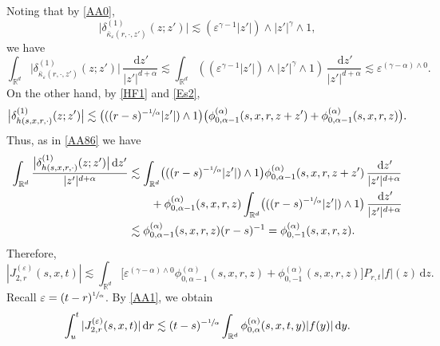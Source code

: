 \documentclass[JEP,XML,SOM,Unicode,published]{cedram}
\theoremstyle{plain}
\theoremstyle{definition}
\let\eps\varepsilon
\newcommand\mR{\mathbb{R}}
\newcommand\1{{\mathbf{1}}}
\newcommand{\dif}{\,\mathrm{d}}
\begin{document}
Noting that by \eqref{AA0},\vspace*{-3pt}
\[
\bigl|\delta^{(1)}_{\bar\kappa_\eps(r,\cdot,z')}(z;z')\bigr|\lesssim (\eps^{\gamma-1}|z'|)\wedge|z'|^\gamma\wedge 1,
\]
we have
\begin{equation*}
\int_{\mR^d}\bigl|\delta^{(1)}_{\bar\kappa_\eps(r,\cdot,z')}(z;z')\bigr|\,\frac{\dif z'}{|z'|^{d+\alpha}}\lesssim
\int_{\mR^d}((\eps^{\gamma-1}|z'|)\wedge|z'|^\gamma\wedge 1)\,\frac{\dif z'}{|z'|^{d+\alpha}}\lesssim\eps^{(\gamma-\alpha)\wedge 0}.
\end{equation*}
On the other hand, by \eqref{HF1} and \eqref{Es2},
\begin{equation*}
\bigl|\delta^{(1)}_{h(s,x,r,\cdot)}(z;z')\bigr|\lesssim \bigl(((r-s)^{-\sfrac1\alpha}|z'|)\wedge 1\bigr)
\bigl(\phi^{(\alpha)}_{0,\alpha-1}(s,x,r,z+z')+\phi^{(\alpha)}_{0,\alpha-1}(s,x,r,z)\bigr).
\end{equation*}
Thus, as in \eqref{AA86} we have\vspace*{-3pt}
\begin{align*}
\int_{\mR^d}\frac{\bigl|\delta^{(1)}_{h(s,x,r,\cdot)}(z;z')\bigr|\dif z'}{|z'|^{d+\alpha}}
&\lesssim \int_{\mR^d}\bigl(((r-s)^{-\sfrac1\alpha}|z'|)\wedge 1\bigr)\phi^{(\alpha)}_{0,\alpha-1}(s,x,r,z+z')\,\frac{\dif z'}{|z'|^{d+\alpha}}\\
&\hspace*{.7cm}+\phi^{(\alpha)}_{0,\alpha-1}(s,x,r,z)\int_{\mR^d}\bigl(((r-s)^{-\sfrac1\alpha}|z'|)\wedge 1\bigr)\,\frac{\dif z'}{|z'|^{d+\alpha}}\\
&\lesssim \phi^{(\alpha)}_{0,\alpha-1}(s,x,r,z)(r-s)^{-1}=\phi^{(\alpha)}_{0,-1}(s,x,r,z).
\end{align*}
Therefore,\vspace*{-3pt}
\begin{equation*}
|J^{(\eps)}_{2,r}(s,x,t)|
\lesssim \int_{\mR^d}\Big[\eps^{
(\gamma-\alpha)\wedge 0
}\phi^{(\alpha)}_{0,\alpha-1}(s,x,r,z)
+\phi^{(\alpha)}_{0,-1}(s,x,r,z)\Big]P_{r,t}|f|(z)\dif z.
\end{equation*}
Recall $\eps=(t-r)^{\sfrac1\alpha}$. By \eqref{AA1}, we obtain\vspace*{-3pt}
\[
\int_{u}^t |J^{(\eps)}_{2,r}(s,x,t)|\dif r\lesssim(t-s)^{-\sfrac1\alpha}\int_{\mR^d}\phi^{(\alpha)}_{0,\alpha}(s,x,t,y)|f(y)|\dif y.
\]
\end{document}

